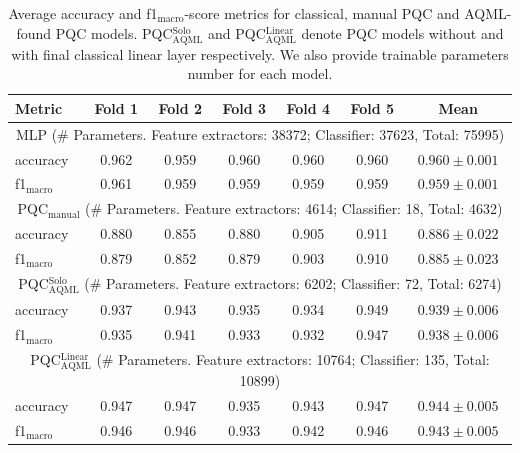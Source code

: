 \documentclass[runningheads]{llncs}
\begin{document}
\begin{table}[t]
	\centering
	\caption{Average accuracy and f1$_{\mathrm{macro}}$-score metrics for classical, manual PQC and AQML-found PQC
		models. PQC$^{\mathrm{Solo}}_{\mathrm{AQML}}$ and PQC$^{\mathrm{Linear}}_{\mathrm{AQML}}$ denote
		PQC models without and with final classical linear layer respectively. We also provide trainable parameters
		number for each model.}
	\label{tab:mnist_results}
	\begin{tabular}{l|ccccc|c}
		\hline
		\textbf{Metric}       & \textbf{Fold 1} & \textbf{Fold 2} & \textbf{Fold 3} & \textbf{Fold 4} & \textbf{Fold 5} & \textbf{Mean}       \\
		\hline
		\multicolumn{7}{c}{MLP (\# Parameters. Feature extractors: 38372; Classifier: 37623, Total: 75995)}                                   \\
		\hline
		accuracy              & 0.962           & 0.959           & 0.960           & 0.960           & 0.960           & $0.960 \pm 0.001$   \\
		f1$_{\mathrm{macro}}$ & 0.961           & 0.959           & 0.959           & 0.959           & 0.959           & $0.959 \pm 0.001$   \\
		\hline
		\multicolumn{7}{c}{PQC$_{\mathrm{manual}}$ (\# Parameters. Feature extractors: 4614; Classifier: 18, Total: 4632)}                    \\
		\hline
		accuracy              & 0.880           & 0.855           & 0.880           & 0.905           & 0.911           & $0.886 \pm 0.022$   \\
		f1$_{\mathrm{macro}}$ & 0.879           & 0.852           & 0.879           & 0.903           & 0.910           & $0.885 \pm 0.023$   \\
		\hline
		\multicolumn{7}{c}{PQC$^{\mathrm{Solo}}_{\mathrm{AQML}}$ (\# Parameters. Feature extractors: 6202; Classifier: 72, Total: 6274)}      \\
		\hline
		accuracy              & 0.937           & 0.943           & 0.935           & 0.934           & 0.949           & $0.939 \pm 0.006$   \\
		f1$_{\mathrm{macro}}$ & 0.935           & 0.941           & 0.933           & 0.932           & 0.947           & $0.938 \pm 0.006$   \\
		\hline
		\multicolumn{7}{c}{PQC$^{\mathrm{Linear}}_{\mathrm{AQML}}$ (\# Parameters. Feature extractors: 10764; Classifier: 135, Total: 10899)} \\
		\hline
		accuracy              & 0.947           & 0.947           & 0.935           & 0.943           & 0.947           & $0.944 \pm 0.005$   \\
		f1$_{\mathrm{macro}}$ & 0.946           & 0.946           & 0.933           & 0.942           & 0.946           & $0.943 \pm 0.005$   \\
		\hline
	\end{tabular}
\end{table}
\end{document}
